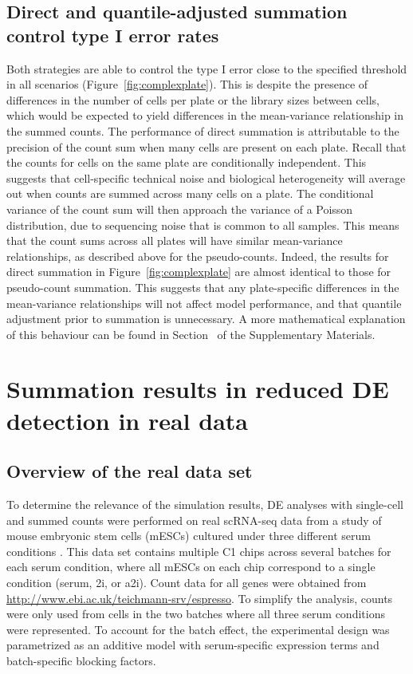 \documentclass[oupdraft]{bio}
\begin{document}
\subsection{Direct and quantile-adjusted summation control type I error rates}
Both strategies are able to control the type I error close to the specified threshold in all scenarios (Figure~\ref{fig:complexplate}).
This is despite the presence of differences in the number of cells per plate or the library sizes between cells,
    which would be expected to yield differences in the mean-variance relationship in the summed counts.
The performance of direct summation is attributable to the precision of the count sum when many cells are present on each plate.
Recall that the counts for cells on the same plate are conditionally independent. 
This suggests that cell-specific technical noise and biological heterogeneity will average out when counts are summed across many cells on a plate.
The conditional variance of the count sum will then approach the variance of a Poisson distribution, due to sequencing noise \citep{marioni2008rnaseq} that is common to all samples.
This means that the count sums across all plates will have similar mean-variance relationships, as described above for the pseudo-counts.
Indeed, the results for direct summation in Figure~\ref{fig:complexplate} are almost identical to those for pseudo-count summation.
This suggests that any plate-specific differences in the mean-variance relationships will not affect model performance, and that quantile adjustment prior to summation is unnecessary.
A more mathematical explanation of this behaviour can be found in Section~\suppmeanvar{} of the Supplementary Materials.

\section{Summation results in reduced DE detection in real data}

\subsection{Overview of the real data set}
To determine the relevance of the simulation results, DE analyses with single-cell and summed counts were performed on real scRNA-seq data from a study of mouse embryonic stem cells (mESCs) cultured under three different serum conditions \citep{kolod2015single}.
This data set contains multiple C1 chips across several batches for each serum condition, where all mESCs on each chip correspond to a single condition (serum, 2i, or a2i). 
Count data for all genes were obtained from \url{http://www.ebi.ac.uk/teichmann-srv/espresso}.
To simplify the analysis, counts were only used from cells in the two batches where all three serum conditions were represented.
To account for the batch effect, the experimental design was parametrized as an additive model with serum-specific expression terms and batch-specific blocking factors.
\end{document}
